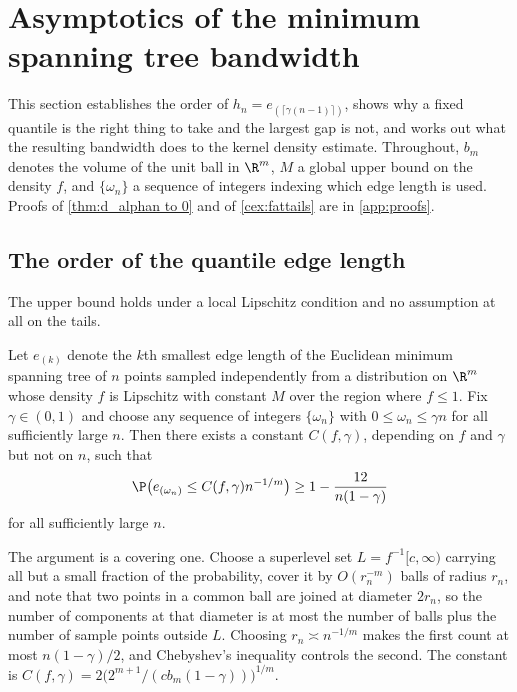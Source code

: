 \section{Asymptotics of the minimum spanning tree bandwidth} \label{sec:theory}

This section establishes the order of $h_n = e_{(\lceil\gamma(n-1)\rceil)}$, shows why a fixed quantile is the right thing to take and the largest gap is not, and works out what the resulting bandwidth does to the kernel density estimate. Throughout, $b_m$ denotes the volume of the unit ball in $\R^m$, $M$ a global upper bound on the density $f$, and $\{\omega_n\}$ a sequence of integers indexing which edge length is used. Proofs of \cref{thm:d_alphan to 0} and of \cref{cex:fattails} are in \cref{app:proofs}.

\subsection{The order of the quantile edge length}\label{sec:order}

The upper bound holds under a local Lipschitz condition and no assumption at all on the tails.

\begin{theorem}\label{thm:d_alphan to 0}
  Let $e_{(k)}$ denote the $k$th smallest edge length of the Euclidean minimum spanning tree of $n$ points sampled independently from a distribution on $\R^m$ whose density $f$ is Lipschitz with constant $M$ over the region where $f\leq 1$. Fix $\gamma\in (0,1)$ and choose any sequence of integers $\{\omega_n\}$ with $0\leq \omega_n \leq \gamma n$ for all sufficiently large $n$. Then there exists a constant $C(f,\gamma)$, depending on $f$ and $\gamma$ but not on $n$, such that
  $$
  \P\big(e_{(\omega_n)} \leq C(f,\gamma)n^{-1/m}\big) \geq 1- \frac{12}{n(1-\gamma)}
  $$
  for all sufficiently large $n$.
\end{theorem}

The argument is a covering one. Choose a superlevel set $L = f^{-1}[c,\infty)$ carrying all but a small fraction of the probability, cover it by $O(r_n^{-m})$ balls of radius $r_n$, and note that two points in a common ball are joined at diameter $2r_n$, so the number of components at that diameter is at most the number of balls plus the number of sample points outside $L$. Choosing $r_n \asymp n^{-1/m}$ makes the first count at most $n(1-\gamma)/2$, and Chebyshev's inequality controls the second. The constant is $C(f,\gamma)= 2\big(2^{m+1}/(c b_m (1-\gamma))\big)^{1/m}$.

